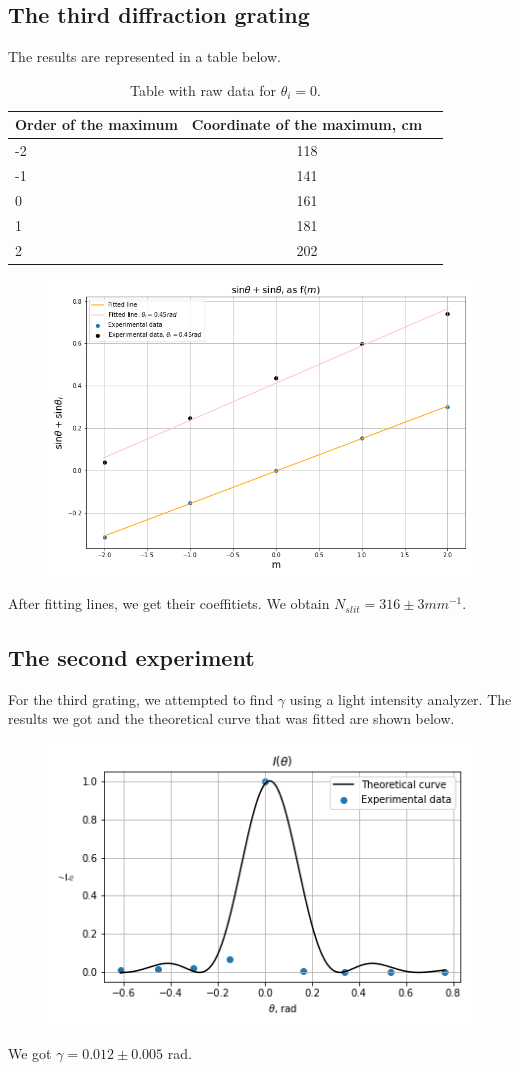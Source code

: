 \documentclass[a4paper, 12pt]{article}
\begin{document}
	\subsection*{The third diffraction grating}
	The results are represented in a table below. 
	\begin{table}[H]
		\centering
		\caption{Table with raw data for $\theta_{i} = 0$.}
		\begin{tabular}[t]{lcc}
			\hline
			Order of the maximum&Coordinate of the maximum, cm\\
			\hline
			-2&118\\
			-1&141\\
			0&161\\
			1&181\\
			2&202\\
			\hline
		\end{tabular}
	\end{table}
	\begin{figure}[H]
		\centering
		\includegraphics[width=0.75\linewidth]{300.png}
		\caption{}
		\label{fig:300}
	\end{figure}
	After fitting lines, we get their coeffitiets. We obtain $N_{slit} = 316 \pm 3 mm^{-1}$.
	\subsection*{The second experiment}
	For the third grating, we attempted to find $\gamma$ using a light intensity analyzer. The results we got and the theoretical curve that was fitted are shown below.
	\begin{figure}[H]
		\centering
		\includegraphics[width=0.85\linewidth]{gamma.png}
		\caption{}
		\label{fig:10}
	\end{figure}
	We got $\gamma = 0.012 \pm 0.005$ rad.
\end{document}
